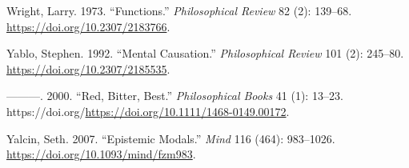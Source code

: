 \documentclass[
  12pt,
  letterpaper,
  DIV=11,
  numbers=noendperiod]{scrartcl}
\newlength{\cslhangindent}
\newenvironment{CSLReferences}[2] %
 {\begin{list}{}{%
  \setlength{\itemindent}{0pt}
  \setlength{\leftmargin}{0pt}
  \setlength{\parsep}{0pt}
  \ifodd #1
   \setlength{\leftmargin}{\cslhangindent}
   \setlength{\itemindent}{-1\cslhangindent}
  \fi
  \setlength{\itemsep}{#2\baselineskip}}}
 {\end{list}}
\begin{document}
\begin{CSLReferences}{1}{0}
Wright, Larry. 1973. {``Functions.''} \emph{Philosophical Review} 82
(2): 139--68. \url{https://doi.org/10.2307/2183766}.

Yablo, Stephen. 1992. {``Mental Causation.''} \emph{Philosophical
Review} 101 (2): 245--80. \url{https://doi.org/10.2307/2185535}.

---------. 2000. {``Red, Bitter, Best.''} \emph{Philosophical Books} 41
(1): 13--23.
https://doi.org/\url{https://doi.org/10.1111/1468-0149.00172}.

Yalcin, Seth. 2007. {``Epistemic Modals.''} \emph{Mind} 116 (464):
983--1026. \url{https://doi.org/10.1093/mind/fzm983}.

\end{CSLReferences}
\end{document}
